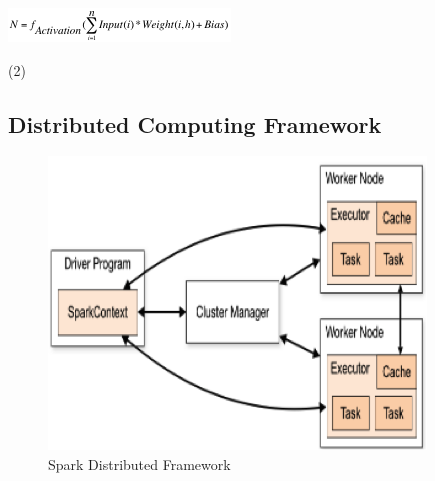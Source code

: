\begin{center}
          
  \includegraphics[scale=0.8]{images/equation.png}
              
\end{center}

\begin{flushright}

(2)
\end{flushright}




\subsection{Distributed Computing Framework}
    \begin{figure}[H]
      
      \includegraphics[scale=1.5]{images/Spark.png}
      \caption{Spark Distributed Framework}
      \label{fig:Spark}
          
    \end{figure}


